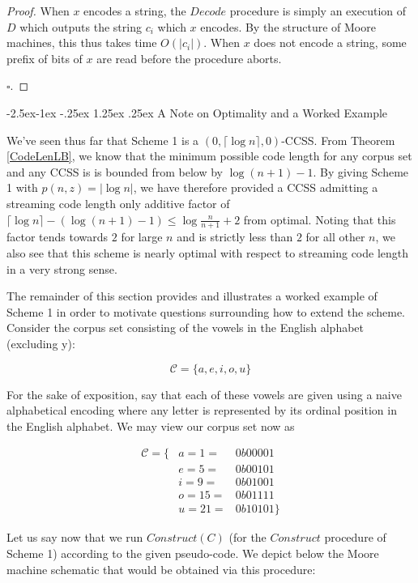 \documentclass{article}
\makeatletter
\renewcommand\paragraph{\@startsection{paragraph}{4}{\z@}%
            {-2.5ex\@plus -1ex \@minus -.25ex}%
            {1.25ex \@plus .25ex}%
            {\normalfont\normalsize\bfseries}}
\theoremstyle{definition}
\makeatother
\begin{document}
\begin{proof}
When $x$ encodes a string, the $Decode$ procedure is simply an execution of $D$ 
which outputs the string $c_i$ which $x$ encodes.  By the structure of Moore machines, 
this thus takes time $O(\lvert c_i\rvert)$.  When $x$ does not encode a string,
some prefix of bits of $x$ are read before the procedure aborts.

$\square$.
\end{proof}

\paragraph{A Note on Optimality and a Worked Example}

We've seen thus far that Scheme 1 is a $(0,\lceil \log{n} \rceil,0)$-CCSS.  From Theorem 
\ref{CodeLenLB}, we know that the minimum possible code length for any 
corpus set and any CCSS is is bounded from below by $\log (n+1) - 1$.  By giving 
Scheme 1 with $p(n,z)=\lvert \log{n} \rvert$, we have therefore provided a CCSS admitting a streaming 
code length only 
additive factor of $\lceil \log{n} \rceil - (\log{(n+1)}-1) \leq \log{\frac{n}{n+1}} + 2$ from optimal.  Noting 
that this factor tends towards $2$ for large $n$ and is strictly less than $2$ for 
all other $n$, we also see that this scheme is nearly optimal with respect to 
streaming code length in a very strong sense.

The remainder of this section provides and illustrates a worked example of Scheme 1 
in order to motivate questions surrounding how to extend the scheme.  Consider the 
corpus set consisting of the vowels in the English alphabet (excluding y):

\[ \mathcal{C} = \{a,e,i,o,u\} \]

\noindent For the sake of exposition, say that each of these vowels are given 
using a naive alphabetical encoding where any letter is represented by its 
ordinal position in the English alphabet.  We may view our corpus set now as

\begin{align*}
\mathcal{C} = \{&a = 1 = &0b00001 \\
&e = 5 = &0b00101 \\
&i = 9 = &0b01001 \\
&o = 15 = &0b01111 \\
&u = 21 = &0b10101 \}
\end{align*} 

\noindent Let us say now that we run $Construct(C)$ (for the $Construct$ procedure 
of Scheme 1) according to the given pseudo-code.  We depict below the Moore 
machine schematic that would be obtained via this procedure:
\end{document}
